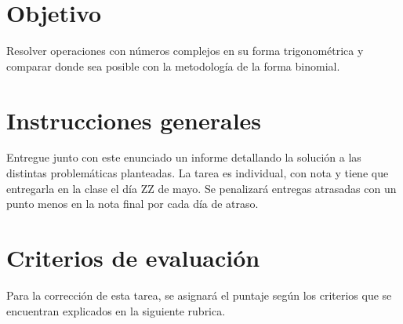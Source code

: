 \documentclass[sin nombre]{srs}
\begin{document}
\section*{Objetivo}
  Resolver operaciones con números complejos en su forma trigonométrica y comparar
  donde sea posible con la metodología de la forma binomial.

\section*{Instrucciones generales}
  Entregue junto con este enunciado un informe detallando la solución a las
  distintas problemáticas planteadas. La tarea es individual, con nota y tiene
  que entregarla en la clase el día ZZ de mayo. Se penalizará entregas atrasadas
  con un punto menos en la nota final por cada día de atraso.

\section*{Criterios de evaluación}
  Para la corrección de esta tarea, se asignará el puntaje según los criterios que
  se encuentran explicados en la siguiente rubrica.
\end{document}
